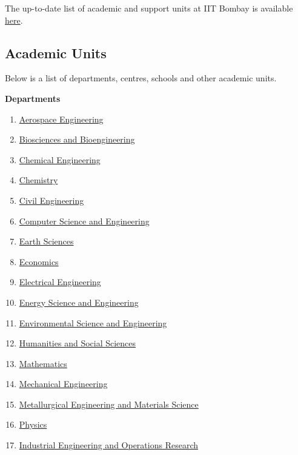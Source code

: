 \documentclass[
  10pt,
  a5paper,
  10pt,
  openany]{amsbook}
\providecommand{\tightlist}{%
  \setlength{\itemsep}{0pt}\setlength{\parskip}{0pt}}
\begin{document}
The up-to-date list of academic and support units at IIT Bombay is
available \href{https://www.iitb.ac.in/divisions}{here}.

\subsection{Academic Units}\label{academic-units}

Below is a list of departments, centres, schools and other academic
units.

\textbf{Departments}

\begin{enumerate}
\def\labelenumi{\arabic{enumi}.}
\tightlist
\item
  \href{http://www.aero.iitb.ac.in/}{Aerospace Engineering}
\item
  \href{http://www.bio.iitb.ac.in/}{Biosciences and Bioengineering}
\item
  \href{http://www.che.iitb.ac.in/}{Chemical Engineering}
\item
  \href{http://www.chem.iitb.ac.in/}{Chemistry}
\item
  \href{http://www.civil.iitb.ac.in/}{Civil Engineering}
\item
  \href{http://www.cse.iitb.ac.in/}{Computer Science and Engineering}
\item
  \href{http://www.geos.iitb.ac.in/}{Earth Sciences}
\item
  \href{https://www.economics.iitb.ac.in/}{Economics}
\item
  \href{http://www.ee.iitb.ac.in/}{Electrical Engineering}
\item
  \href{http://www.ese.iitb.ac.in/}{Energy Science and Engineering}
\item
  \href{http://www.esed.iitb.ac.in/}{Environmental Science and
  Engineering}
\item
  \href{http://www.hss.iitb.ac.in/}{Humanities and Social Sciences}
\item
  \href{http://www.math.iitb.ac.in/}{Mathematics}
\item
  \href{http://www.me.iitb.ac.in/}{Mechanical Engineering}
\item
  \href{http://www.met.iitb.ac.in/}{Metallurgical Engineering and
  Materials Science}
\item
  \href{http://www.phy.iitb.ac.in/}{Physics}
\item
  \href{http://www.ieor.iitb.ac.in/}{Industrial Engineering and
  Operations Research}
\end{enumerate}
\end{document}
